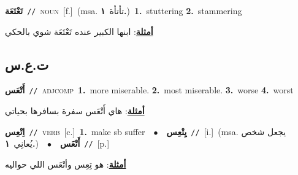 \documentclass[10pt,a4paper,twoside]{article} %
\begin{document}
\begin{multicols}{2}
{{{{{{{{{{{{\setlength\topsep{0pt}\textbf{\foreignlanguage{arabic}{تَعْتَعَة}}\ {\color{gray}\texttt{//}\color{black}}\ \textsc{noun}\ [f.]\ \color{gray}(msa. \foreignlanguage{arabic}{تأتأة}~\foreignlanguage{arabic}{\textbf{١.}})\color{black}\ \textbf{1.}~stuttering  \textbf{2.}~stammering\  \begin{flushright}\color{gray}\foreignlanguage{arabic}{\textbf{\underline{\foreignlanguage{arabic}{أمثلة}}}: ابنها الكبير عنده تَعْتَعَة شوي بالحكي}\end{flushright}\color{black}} \vspace{2mm}

\vspace{-3mm}
\subsection*{\color{blue}\foreignlanguage{arabic}{ت.ع.س}\color{blue}{}} 

{\setlength\topsep{0pt}\textbf{\foreignlanguage{arabic}{أَتْعَس}}\ {\color{gray}\texttt{//}\color{black}}\ \textsc{adj\textunderscore comp}\ \textbf{1.}~more miserable.  \textbf{2.}~most miserable.  \textbf{3.}~worse  \textbf{4.}~worst\  \begin{flushright}\color{gray}\foreignlanguage{arabic}{\textbf{\underline{\foreignlanguage{arabic}{أمثلة}}}: هاي أَتْعَس سفرة بسافرها بحياتي}\end{flushright}\color{black}} \vspace{2mm}

{\setlength\topsep{0pt}\textbf{\foreignlanguage{arabic}{اِتْعِس}}\ {\color{gray}\texttt{//}\color{black}}\ \textsc{verb}\ [c.]\ \textbf{1.}~make sb suffer\ \ $\bullet$\ \ \setlength\topsep{0pt}\textbf{\foreignlanguage{arabic}{يِتْعِس}}\ {\color{gray}\texttt{//}\color{black}}\ [i.]\ \color{gray}(msa. \foreignlanguage{arabic}{يجعل شخص يُعانِي}~\foreignlanguage{arabic}{\textbf{١.}})\color{black}\ \ $\bullet$\ \ \setlength\topsep{0pt}\textbf{\foreignlanguage{arabic}{أَتْعَس}}\ {\color{gray}\texttt{//}\color{black}}\ [p.]\  \begin{flushright}\color{gray}\foreignlanguage{arabic}{\textbf{\underline{\foreignlanguage{arabic}{أمثلة}}}: هو تِعِس وأتْعَس اللي حواليه}\end{flushright}\color{black}} \vspace{2mm}

}}}}}}}}}}}
\end{multicols}
\end{document}
